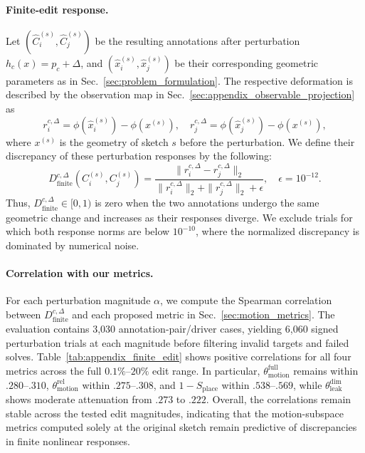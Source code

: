 \paragraph{Finite-edit response.}
Let $(\hat{C}^{(s)}_i,\hat{C}^{(s)}_j)$ be the resulting annotations after perturbation $h_c(x)=p_c+\Delta$, and $(\hat{x}^{(s)}_i,\hat{x}^{(s)}_j)$ be their corresponding geometric parameters as in Sec.~\ref{sec:problem_formulation}. The respective deformation is described by the observation map in Sec.~\ref{sec:appendix_observable_projection} as
\begin{equation}
r_i^{c,\Delta}=\phi(\hat{x}^{(s)}_i)-\phi(x^{(s)}),\quad r_j^{c,\Delta}=\phi(\hat{x}^{(s)}_j)-\phi(x^{(s)}),
\end{equation}
where $x^{(s)}$ is the geometry of sketch $s$ before the perturbation. We define their discrepancy of these perturbation responses by the following:
\begin{equation}
D_\mathrm{finite}^{c,\Delta}(C^{(s)}_i, C^{(s)}_j) = \frac{\| r_i^{c,\Delta} - r_j^{c,\Delta} \|_2}{\| r_i^{c,\Delta} \|_2 + \| r_j^{c,\Delta} \|_2 + \epsilon},\quad \epsilon=10^{-12}.
\end{equation}
Thus, $D_\mathrm{finite}^{c,\Delta}\in[0,1)$ is zero when the two annotations undergo the same geometric change and increases as their responses diverge. We exclude trials for which both response norms are below $10^{-10}$, where the normalized discrepancy is dominated by numerical noise.

\paragraph{Correlation with our metrics.}
For each perturbation magnitude $\alpha$, we compute the Spearman correlation between $D_\mathrm{finite}^{c,\Delta}$ and each proposed metric in Sec.~\ref{sec:motion_metrics}. The evaluation contains 3,030 annotation-pair/driver cases, yielding 6,060 signed perturbation trials at each magnitude before filtering invalid targets and failed solves. Table~\ref{tab:appendix_finite_edit} shows positive correlations for all four metrics across the full $0.1\%$--$20\%$ edit range. In particular, $\theta_\mathrm{motion}^\mathrm{full}$ remains within $.280$--$.310$, $\theta_\mathrm{motion}^\mathrm{rel}$ within $.275$--$.308$, and $1-S_\mathrm{place}$ within $.538$--$.569$, while $\theta_\mathrm{leak}^\mathrm{dim}$ shows moderate attenuation from $.273$ to $.222$. Overall, the correlations remain stable across the tested edit magnitudes, indicating that the motion-subspace metrics computed solely at the original sketch remain predictive of discrepancies in finite nonlinear responses.


